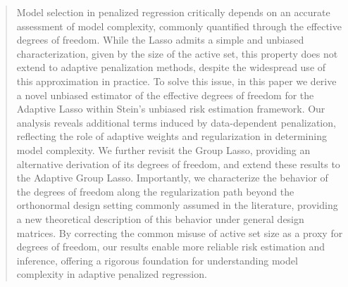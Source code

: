\documentclass[a4paper, 12pt]{article}
\begin{document}
\begin{abstract}
Model selection in penalized regression critically depends on an accurate assessment of model complexity, commonly quantified through the effective degrees of freedom. While the Lasso admits a simple and unbiased characterization, given by the size of the active set, this property does not extend to adaptive penalization methods, despite the widespread use of this approximation in practice. To solve this issue, in this paper we derive a novel unbiased estimator of the effective degrees of freedom for the Adaptive Lasso within Stein’s unbiased risk estimation framework. Our analysis reveals additional terms induced by data-dependent penalization, reflecting the role of adaptive weights and regularization in determining model complexity. We further revisit the Group Lasso, providing an alternative derivation of its degrees of freedom, and extend these results to the Adaptive Group Lasso.
%
Importantly, we characterize the behavior of the degrees of freedom along the regularization path beyond the orthonormal design setting commonly assumed in the literature, providing a new theoretical description of this behavior under general design matrices.
%
By correcting the common misuse of active set size as a proxy for degrees of freedom, our results enable more reliable risk estimation and inference, offering a rigorous foundation for understanding model complexity in adaptive penalized regression. 

\end{abstract}
\end{document}
